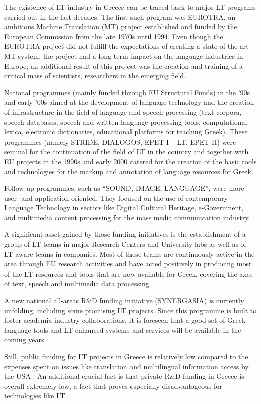 \begin{multicols}{2}
The existence of LT industry in Greece can be traced back to major LT programs carried out in the last decades. The first such program was EUROTRA, an ambitious Machine Translation (MT) project established and funded by the European Commission from the late 1970s until 1994. Even though the EUROTRA project did not fulfill the expectations of creating a state-of-the-art MT system, the project had a long-term impact on the language industries in Europe; an additional result of this project was the creation and training of a critical mass of scientists, researchers in the emerging field. 

National programmes (mainly funded through EU Structural Funds) in the '90s and early '00s aimed at the development of language technology and the creation of infrastructure in the field of language and speech processing (text corpora, speech databases, speech and written language processing tools, computational lexica, electronic dictionaries, educational platforms for teaching Greek). These programmes (namely STRIDE, DIALOGOS, EPET I – LT, EPET II) were seminal for the continuation of the field of LT in the country and together with EU projects in the 1990s and early 2000 catered for the creation of the basic tools and technologies for the markup and annotation of language resources for Greek.

Follow-up programmes, such as “SOUND, IMAGE, LANGUAGE”, were more user- and application-oriented. They focused on the use of contemporary Language Technology in sectors like Digital Cultural Heritage, e-Government, and multimedia content processing for the mass media communication industry.

A significant asset gained by those funding initiatives is the establishment of a group of LT teams in major Research Centers and University labs as well as of LT-aware teams in companies. Most of these teams are continuously active in the area through EU research activities and have acted positively in producing most of the LT resources and tools that are now available for Greek, covering the axes of text, speech and multimedia data processing.

A new national all-areas R\&D funding initiative (SYNERGASIA) is currently unfolding, including some promising LT projects. Since this programme is built to foster academia-industry collaborations, it is foreseen that a good set of Greek language tools and LT enhanced systems and services will be available in the coming years.

Still, public funding for LT projects in Greece is relatively low compared to the expenses spent on issues like translation and multilingual information access by the USA \cite{laz2}. An additional crucial fact is that private R\&D funding in Greece is overall extremely low, a fact that proves especially disadvantageous for technologies like LT.


\end{multicols}
